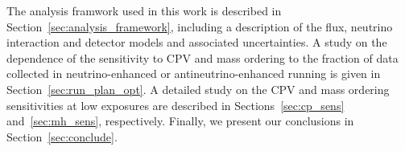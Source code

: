 The analysis framwork used in this work is described in Section~\ref{sec:analysis_framework}, including a description of the flux, neutrino interaction and detector models and associated uncertainties. A study on the dependence of the sensitivity to CPV and mass ordering to the fraction of data collected in neutrino-enhanced or antineutrino-enhanced running is given in Section~\ref{sec:run_plan_opt}. A detailed study on the CPV and mass ordering sensitivities at low exposures are described in Sections~\ref{sec:cp_sens} and~\ref{sec:mh_sens}, respectively. Finally, we present our conclusions in Section~\ref{sec:conclude}.

